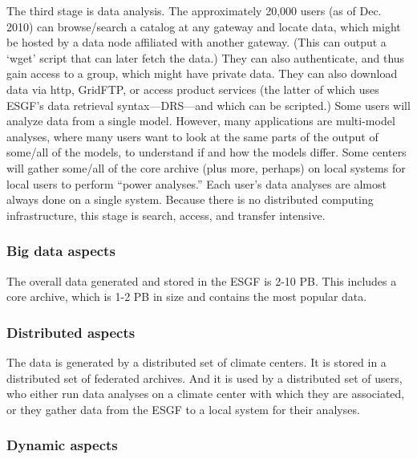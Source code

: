 The third stage is data analysis.
The approximately 20,000 users (as of Dec. 2010) can browse/search a catalog at any gateway and locate data, which might be hosted by a data node affiliated with another gateway. (This can output a `wget' script that can later fetch the data.)  They can also authenticate, and thus gain access to a group, which might have private data.  They can also download data via http, GridFTP, or access product services (the latter of which uses ESGF's data retrieval syntax---DRS---and which can be scripted.)
Some users will analyze data from a single model.  However, many applications are multi-model analyses, where many users want to look at the same parts of the output of some/all of the models, to understand if and how the models differ.
Some centers will gather some/all of the core archive (plus more, perhaps) on local systems for local users to perform ``power analyses.''
Each user's data analyses are almost always done on a single system.  Because there is no distributed computing infrastructure, this stage is search, access, and transfer intensive.


 \subsubsection*{Big data aspects}



The overall data generated and stored in the ESGF is 2-10 PB.  This includes a  core archive, which is 1-2 PB in size and contains the most popular data.

 \subsubsection*{Distributed aspects}



The data is generated by a distributed set of climate centers.  It is stored in a distributed set of federated archives.  And it is used by a distributed set of users, who either run data analyses on a climate center with which they are associated, or they gather data from the ESGF to a local system for their analyses.

 \subsubsection*{Dynamic aspects}


